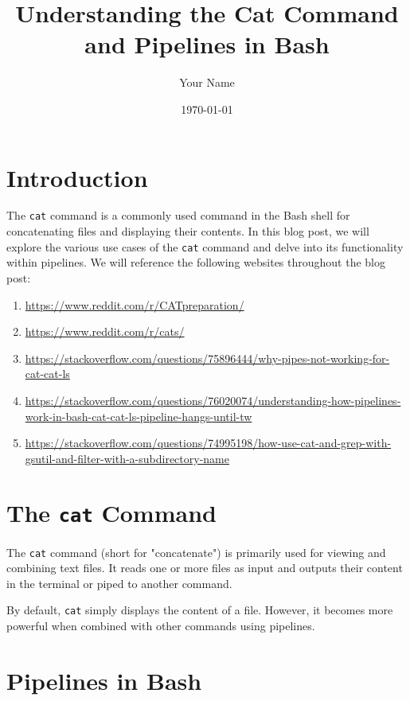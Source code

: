 \documentclass{article}
\begin{document}
\title{Understanding the Cat Command and Pipelines in Bash}
\author{Your Name}
\date{\today}

\maketitle

\section{Introduction}
The \texttt{cat} command is a commonly used command in the Bash shell for concatenating files and displaying their contents. In this blog post, we will explore the various use cases of the \texttt{cat} command and delve into its functionality within pipelines. We will reference the following websites throughout the blog post:

\begin{enumerate}
  \item \url{https://www.reddit.com/r/CATpreparation/}
  \item \url{https://www.reddit.com/r/cats/}
  \item \url{https://stackoverflow.com/questions/75896444/why-pipes-not-working-for-cat-cat-ls}
  \item \url{https://stackoverflow.com/questions/76020074/understanding-how-pipelines-work-in-bash-cat-cat-ls-pipeline-hangs-until-tw}
  \item \url{https://stackoverflow.com/questions/74995198/how-use-cat-and-grep-with-gsutil-and-filter-with-a-subdirectory-name}
\end{enumerate}

\section{The \texttt{cat} Command}

The \texttt{cat} command (short for "concatenate") is primarily used for viewing and combining text files. It reads one or more files as input and outputs their content in the terminal or piped to another command.

By default, \texttt{cat} simply displays the content of a file. However, it becomes more powerful when combined with other commands using pipelines.

\section{Pipelines in Bash}
\end{document}
